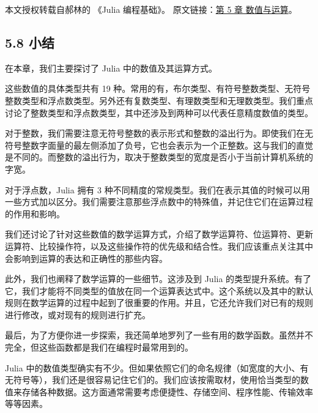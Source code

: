 
本文授权转载自郝林的 《Julia 编程基础》。 原文链接：\href{https://github.com/hyper0x/JuliaBasics/blob/master/book/ch05.md}{第 5 章 数值与运算}。


\subsection{5.8 小结}

在本章，我们主要探讨了 Julia 中的数值及其运算方式。

这些数值的具体类型共有 19 种。常用的有，布尔类型、有符号整数类型、无符号整数类型和浮点数类型。另外还有复数类型、有理数类型和无理数类型。我们重点讨论了整数类型和浮点数类型，其中还涉及到两种可以代表任意精度数值的类型。

对于整数，我们需要注意无符号整数的表示形式和整数的溢出行为。即使我们在无符号整数字面量的最左侧添加了负号，它也会表示为一个正整数。这与我们的直觉是不同的。而整数的溢出行为，取决于整数类型的宽度是否小于当前计算机系统的字宽。

对于浮点数，Julia 拥有 3 种不同精度的常规类型。我们在表示其值的时候可以用一些方式加以区分。我们需要注意那些浮点数中的特殊值，并记住它们在运算过程的作用和影响。

我们还讨论了针对这些数值的数学运算方式，介绍了数学运算符、位运算符、更新运算符、比较操作符，以及这些操作符的优先级和结合性。我们应该重点关注其中会影响到运算的表达和正确性的那些内容。

此外，我们也阐释了数学运算的一些细节。这涉及到 Julia 的类型提升系统。有了它，我们才能将不同类型的值放在同一个运算表达式中。这个系统以及其中的默认规则在数学运算的过程中起到了很重要的作用。并且，它还允许我们对已有的规则进行修改，或对现有的规则进行扩充。

最后，为了方便你进一步探索，我还简单地罗列了一些有用的数学函数。虽然并不完全，但这些函数都是我们在编程时最常用到的。

Julia 中的数值类型确实有不少。但如果依照它们的命名规律（如宽度的大小、有无符号等），我们还是很容易记住它们的。我们应该按需取材，使用恰当类型的数值来存储各种数据。这方面通常需要考虑便捷性、存储空间、程序性能、传输效率等等因素。